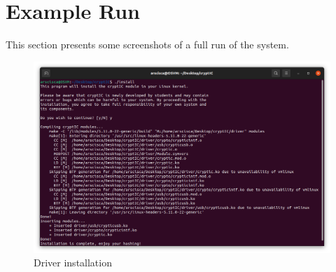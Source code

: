 \section{Example Run}
This section presents some screenshots of a full run of the system.

\begin{figure}[htb]
		\center
		\includegraphics[width=\textwidth]{img/install.png}
		\caption{Driver installation}
\end{figure}

